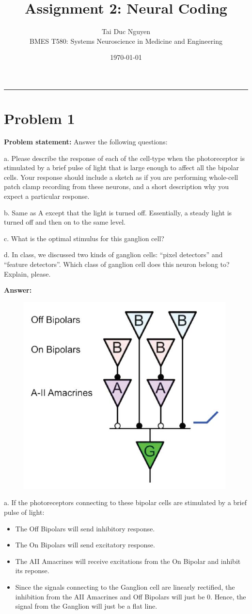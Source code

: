 \documentclass[letterpaper, 11pt]{article}
\title{Assignment 2: Neural Coding}
\author{
Tai Duc Nguyen \\
BMES T580: Systems Neuroscience in Medicine and Engineering
}
\date{\today}
\begin{document}
\maketitle

\rule{\textwidth}{1pt}

\section{Problem 1}
\label{sec:prob1}
\textbf{Problem statement:} Answer the following questions:

a. Please describe the response of each of the cell-type when the photoreceptor is stimulated by a brief pulse of light that is large enough to affect all the bipolar cells. Your response should include a sketch as if you are performing whole-cell patch clamp recording from these neurons, and a short description why you expect a particular response.

b. Same as A except that the light is turned off. Essentially, a steady light is turned off and then on to the same level.

c. What is the optimal stimulus for this ganglion cell? 

d. In class, we discussed two kinds of ganglion cells: “pixel detectors” and “feature detectors”. Which class of ganglion cell does this neuron belong to? Explain, please.

\textbf{Answer:}

\begin{figure}[htb!]
	\centering
	\includegraphics[width=0.5\linewidth]{fig1.png}
	\caption{}
	\label{fig1}
\end{figure}

a. If the photoreceptors connecting to these bipolar cells are stimulated by a brief pulse of light:
\begin{itemize}
	\item The Off Bipolars will send inhibitory response.
	\item The On Bipolars will send excitatory response.
	\item The AII Amacrines will receive excitations from the On Bipolar and inhibit its reponse.
	\item Since the signals connecting to the Ganglion cell are linearly rectified, the inhibition from the AII Amacrines and Off Bipolars will just be 0. Hence, the signal from the Ganglion will just be a flat line.
\end{itemize}
\end{document}
